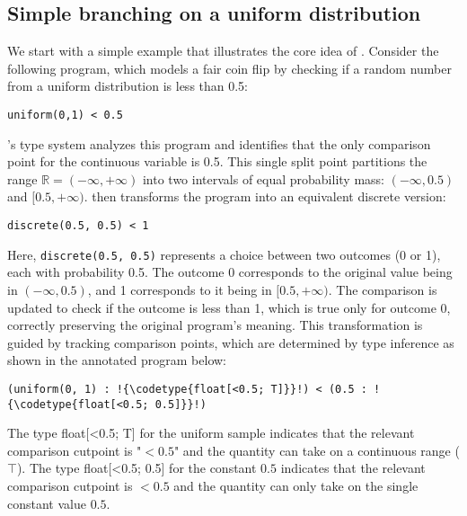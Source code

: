 \documentclass[acmsmall,screen,dvipsnames,x11names,nonacm,anonymous,review]{acmart}
\newcommand{\codetype}[1]{\textcolor{typecolor}{\ttfamily\small#1}}
\newcommand{\Slice}{\text{\scshape Slice}\xspace}
\newcommand{\R}{\mathbb{R}}
\begin{document}
\subsection{Simple branching on a uniform distribution}

We start with a simple example that illustrates the core idea of \Slice. Consider the following program, which models a fair coin flip by checking if a random number from a uniform distribution is less than 0.5:

\begin{lstlisting}[aboveskip=1em,belowskip=1em]
    uniform(0,1) < 0.5
\end{lstlisting}

\noindent \Slice's type system analyzes this program and identifies that the only comparison point for the continuous variable is 0.5. This single split point partitions the range $\R = (-\infty, +\infty)$ into two intervals of equal probability mass: $(-\infty, 0.5)$ and $[0.5, +\infty)$. \Slice then transforms the program into an equivalent discrete version:

\begin{lstlisting}[aboveskip=1em,belowskip=1em]
    discrete(0.5, 0.5) < 1
\end{lstlisting}

\noindent Here, \texttt{discrete(0.5, 0.5)} represents a choice between two outcomes (0 or 1), each with probability 0.5. The outcome 0 corresponds to the original value being in $(-\infty, 0.5)$, and 1 corresponds to it being in $[0.5, +\infty)$. The comparison is updated to check if the outcome is less than 1, which is true only for outcome 0, correctly preserving the original program's meaning. This transformation is guided by tracking comparison points, which are determined by type inference as shown in the annotated program below:

\begin{lstlisting}[aboveskip=1em,belowskip=1em,escapechar=!]
  (uniform(0, 1) : !{\codetype{float[<0.5; T]}}!) < (0.5 : !{\codetype{float[<0.5; 0.5]}}!)
\end{lstlisting}

The type \codetype{float[<0.5; T]} for the uniform sample indicates that the relevant comparison cutpoint is "$<\!\!0.5$" and the quantity can take on a continuous range ($\top$). 
The type \codetype{float[<0.5; 0.5]} for the constant $0.5$ indicates that the relevant comparison cutpoint is $< 0.5$ and the quantity can only take on the single constant value $0.5$. 
\end{document}
